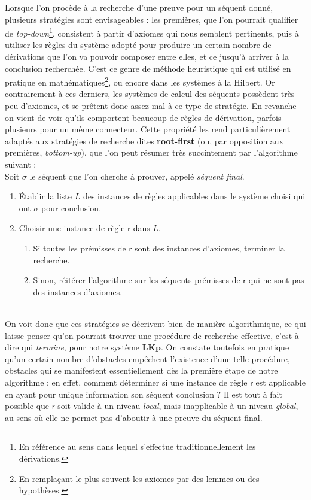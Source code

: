 \documentclass[12pt]{report}
\begin{document}
Lorsque l'on procède à la recherche d'une preuve pour un séquent donné, plusieurs stratégies sont envisageables : les premières, que l'on pourrait qualifier de \emph{top-down}\footnote{En référence au sens dans lequel s'effectue traditionnellement les dérivations.}, consistent à partir d'axiomes qui nous semblent pertinents, puis à utiliser les règles du système adopté pour produire un certain nombre de dérivations que l'on va pouvoir composer entre elles, et ce jusqu'à arriver à la conclusion recherchée. C'est ce genre de méthode heuristique qui est utilisé en pratique en mathématiques\footnote{En remplaçant le plus souvent les axiomes par des lemmes ou des hypothèses.}, ou encore dans les systèmes à la Hilbert. Or contrairement à ces derniers, les systèmes de calcul des séquents possèdent très peu d'axiomes, et se prêtent donc assez mal à ce type de stratégie. En revanche on vient de voir qu'ils comportent beaucoup de règles de dérivation, parfois plusieurs pour un même connecteur. Cette propriété les rend particulièrement adaptés aux stratégies de recherche dites \textbf{root-first} (ou, par opposition aux premières, \emph{bottom-up}), que l'on peut résumer très succintement par l'algorithme suivant :\\

Soit $\sigma$ le séquent que l'on cherche à prouver, appelé \emph{séquent final}.
\begin{enumerate}
    \item Établir la liste $L$ des instances de règles applicables dans le système choisi qui ont $\sigma$ pour conclusion.
    \item Choisir une instance de règle $\mathsf{r}$ dans $L$.
        \begin{enumerate}
            \item Si toutes les prémisses de $\mathsf{r}$ sont des instances d'axiomes, terminer la recherche.
            \item Sinon, réitérer l'algorithme sur les séquents prémisses de $\mathsf{r}$ qui ne sont pas des instances d'axiomes.
        \end{enumerate}
\end{enumerate}
~\\
On voit donc que ces stratégies se décrivent bien de manière algorithmique, ce qui laisse penser qu'on pourrait trouver une procédure de recherche effective, c'est-à-dire qui \emph{termine}, pour notre système $\mathbf{LKp}$. On constate toutefois en pratique qu'un certain nombre d'obstacles empêchent l'existence d'une telle procédure, obstacles qui se manifestent essentiellement dès la première étape de notre algorithme : en effet, comment déterminer si une instance de règle $\mathsf{r}$ est applicable en ayant pour unique information son séquent conclusion ? Il est tout à fait possible que $\mathsf{r}$ soit valide à un niveau \emph{local}, mais inapplicable à un niveau \emph{global}, au sens où elle ne permet pas d'aboutir à une preuve du séquent final.\\
\end{document}
